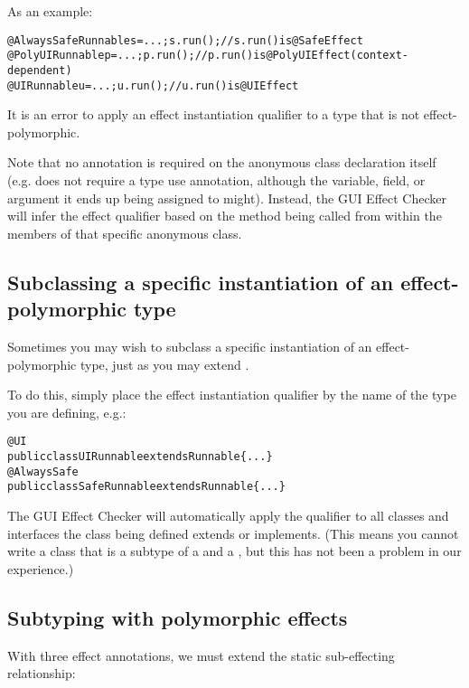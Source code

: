 As an example:

\begin{alltt}
@AlwaysSafe Runnable s = ...;    s.run();    // s.run() is @SafeEffect
@PolyUI Runnable p = ...;        p.run();    // p.run() is @PolyUIEffect (context-dependent)
@UI Runnable u = ...;            u.run();    // u.run() is @UIEffect
\end{alltt}

It is an error to apply an effect instantiation qualifier to a type that is not effect-polymorphic.

Note that no annotation is required on the anonymous class declaration itself (e.g. 
does not require a type use annotation, although the variable, field, or argument it ends up being assigned to might).
Instead, the GUI Effect Checker will infer the effect qualifier based on the method being called from within the
members of that specific anonymous class.

\subsection{Subclassing a specific instantiation of an effect-polymorphic type\label{guieffect-subclassing}}

Sometimes you may wish to subclass a specific instantiation of an effect-polymorphic type, just as
you may extend .

To do this, simply place the effect instantiation qualifier by the name of the type you are
defining, e.g.:

\begin{alltt}
@UI
public class UIRunnable extends Runnable \{...\}
@AlwaysSafe
public class SafeRunnable extends Runnable \{...\}
\end{alltt}
The GUI Effect Checker will automatically apply the qualifier to all classes and interfaces the class
being defined extends or implements.  (This means you cannot write a class that is a subtype of a
 and a , but this has not been a problem in our experience.)


\subsection{Subtyping with polymorphic effects\label{guieffect-subtyping}}

With three effect annotations, we must extend the static sub-effecting relationship:

